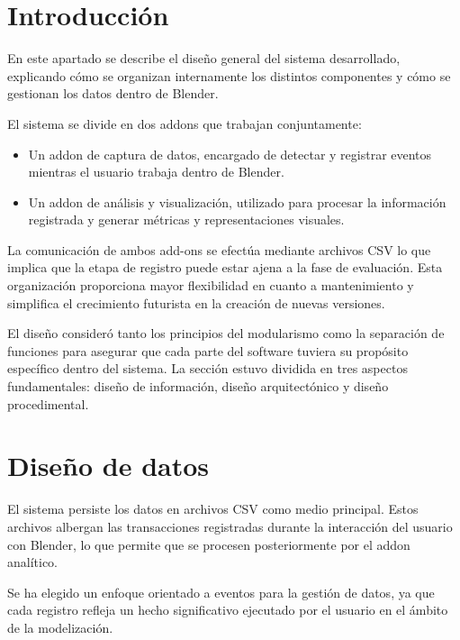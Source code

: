 
\section{Introducción}

En este apartado se describe el diseño general del sistema desarrollado, explicando cómo se organizan internamente los distintos componentes y cómo se gestionan los datos dentro de Blender.

El sistema se divide en dos addons que trabajan conjuntamente:

\begin{itemize}
    \item Un addon de captura de datos, encargado de detectar y registrar eventos mientras el usuario trabaja dentro de Blender.
    
    \item Un addon de análisis y visualización, utilizado para procesar la información registrada y generar métricas y representaciones visuales.
\end{itemize}

La comunicación de ambos add-ons se efectúa mediante archivos CSV lo que implica que la etapa de registro puede estar ajena a la fase de evaluación. Esta organización proporciona mayor flexibilidad en cuanto a mantenimiento y simplifica el crecimiento futurista en la creación de nuevas versiones.

El diseño consideró tanto los principios del modularismo como la separación de funciones para asegurar que cada parte del software tuviera su propósito específico dentro del sistema. La sección estuvo dividida en tres aspectos fundamentales: diseño de información, diseño arquitectónico y diseño procedimental.

\section{Diseño de datos}

El sistema persiste los datos en archivos CSV como medio principal. Estos archivos albergan las transacciones registradas durante la interacción del usuario con Blender, lo que permite que se procesen posteriormente por el addon analítico.

Se ha elegido un enfoque orientado a eventos para la gestión de datos, ya que cada registro refleja un hecho significativo ejecutado por el usuario en el ámbito de la modelización.

